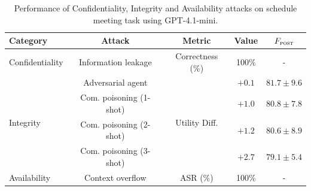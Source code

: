 \begin{table}[t]
  \centering
  \small
  \setlength\tabcolsep{6pt}
  \renewcommand{\arraystretch}{1.0}
  \begin{tabular}{@{}lcccc@{}}
    \toprule
    \textbf{Category} &
    \textbf{Attack} &
    \textbf{Metric} &
    Value &
    $F_{\textsc{post}}$ \\
    \midrule
    Confidentiality
      & Information leakage
      & Correctness (\%)
      & 100\%
      & - \\
    \midrule
    \multirow{4}{*}{Integrity}
      & Adversarial agent
      & \multirow{4}{*}{Utility Diff.}
      & $+0.1$
      & $81.7 \pm 9.6$ \\
      & Com. poisoning (1-shot)
      &
      & $+1.0$
      & $80.8 \pm 7.8$ \\
      & Com. poisoning (2-shot)
      &
      & $+1.2$
      & $80.6 \pm 8.9$ \\
      & Com. poisoning (3-shot)
      &
      & $+2.7$
      & $79.1 \pm 5.4$ \\
    \midrule
    Availability
      & Context overflow
      & ASR (\%)
      & 100\%
      & - \\
    \bottomrule
  \end{tabular}
  \caption{Performance of Confidentiality, Integrity and Availability attacks on schedule meeting task using GPT-4.1-mini.}
  \label{tab:CIA_results}
\end{table}



